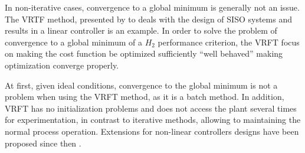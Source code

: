 In non-iterative cases, convergence to a global minimum is generally not an issue. 
The VRTF method, presented by \cite{guardabassi2000a, campi2002} to deals with the design of SISO systems and results in a linear controller is an example.
In order to solve the problem of convergence to a global minimum of a $ H_2 $ performance criterion, the VRFT focus on making the cost function be optimized sufficiently ``well behaved'' making optimization converge properly.

At first, given ideal conditions, convergence to the global minimum is not a problem when using the VRFT method, as it is a batch method. 
In addition, VRFT has no initialization problems and does not access the plant several times for experimentation, in contrast to iterative methods, allowing to maintaining the normal process operation. 
Extensions for non-linear controllers designs have been proposed since then \citep{campi2006a, jeng2014a, jeng2018a}.



